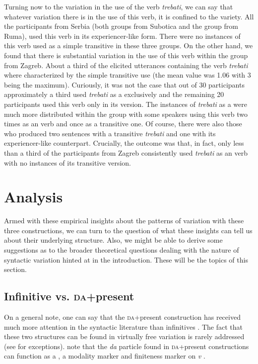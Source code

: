 \documentclass[output=paper,modfonts,newtxmath,hidelinks,]{langscibook}
\begin{document}
\largerpage%
Turning now to the variation in the use of the verb \textit{trebati}, we can say that whatever variation there is in the use of this verb, it is confined to the  variety. All the participants from Serbia (both groups from Subotica and the group from Ruma), used this verb in its experiencer-like form. There were no instances of this verb used as a simple transitive in these three groups. On the other hand, we found that there is substantial variation in the use of this verb within the group from Zagreb. About a third of the elicited utterances containing the verb \textit{trebati} where characterized by the simple transitive use (the mean value was 1.06 with 3 being the maximum). Curiously, it was not the case that out of 30 participants approximately a third used \textit{trebati} as a  exclusively and the remaining 20 participants used this verb only in its  version. The instances of \textit{trebati} as a  were much more distributed within the group with some speakers using this verb two times as an  verb and once as a transitive one. Of course, there were also those who produced two sentences with a transitive \textit{trebati} and one with its experiencer-like counterpart. Crucially, the outcome was that, in fact, only less than a third of the participants from Zagreb consistently used \textit{trebati} as an  verb with no instances of its transitive version.

\section{Analysis}\label{7:s4}


\largerpage%
Armed with these empirical insights about the patterns of variation with these three constructions, we can turn to the question of what these insights can tell us about their underlying structure. Also, we might be able to derive some suggestions as to the broader theoretical questions dealing with the nature of syntactic variation hinted at in the introduction. These will be the topics of this section.

\subsection{Infinitive vs. \textsc{da}+present}\label{7:s4.1}

On a general note, one can say that the \textsc{da}+present construction has received much more attention in the syntactic literature than infinitives \citep{Todorovic2012,Miseska-Tomic2004}. The fact that these two structures can be found in virtually free variation is rarely addressed (see \citealt{Belic2005} for exceptions). \citet{TodorovicWurmbrand2015} note that the \textit{da} particle found in \textsc{da}+present constructions can function as a  , a modality marker  and finiteness marker on \textit{v} .
\end{document}
